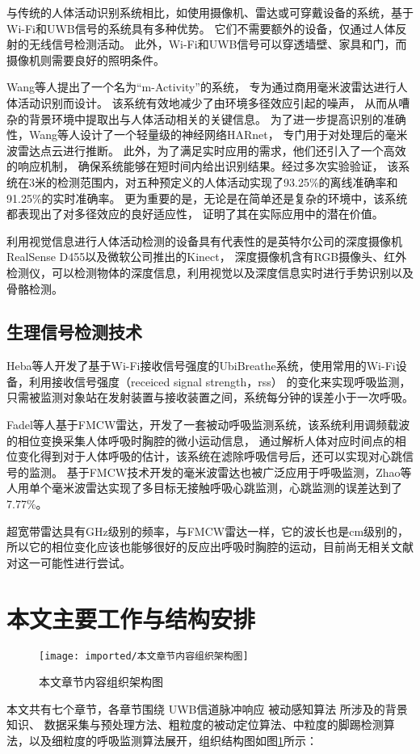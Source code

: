 与传统的人体活动识别系统相比，如使用摄像机、雷达或可穿戴设备的系统，基于Wi-Fi和UWB信号的系统具有多种优势。
它们不需要额外的设备，仅通过人体反射的无线信号检测活动。
此外，Wi-Fi和UWB信号可以穿透墙壁、家具和门，而摄像机则需要良好的照明条件。 

Wang等人\cite{Wang_Wifi_HAR}提出了一个名为“m-Activity”的系统，
专为通过商用毫米波雷达进行人体活动识别而设计。
该系统有效地减少了由环境多径效应引起的噪声，
从而从嘈杂的背景环境中提取出与人体活动相关的关键信息。
为了进一步提高识别的准确性，Wang等人设计了一个轻量级的神经网络HARnet，
专门用于对处理后的毫米波雷达点云进行推断。
此外，为了满足实时应用的需求，他们还引入了一个高效的响应机制，
确保系统能够在短时间内给出识别结果。经过多次实验验证，
该系统在3米的检测范围内，对五种预定义的人体活动实现了93.25\%的离线准确率和91.25\%的实时准确率。
更为重要的是，无论是在简单还是复杂的环境中，该系统都表现出了对多径效应的良好适应性，
证明了其在实际应用中的潜在价值。

利用视觉信息进行人体活动检测的设备具有代表性的是英特尔公司的深度摄像机RealSense D455以及微软公司推出的Kinect，
深度摄像机含有RGB摄像头、红外检测仪，可以检测物体的深度信息，利用视觉以及深度信息实时进行手势识别以及骨骼检测。

\subsection{生理信号检测技术}
Heba等人\cite{UbiBreathe}开发了基于Wi-Fi接收信号强度的UbiBreathe系统，使用常用的Wi-Fi设备，利用接收信号强度（receiced signal strength，rss）
的变化来实现呼吸监测，只需被监测对象站在发射装置与接收装置之间，系统每分钟的误差小于一次呼吸。

Fadel等人\cite{Adib_Breathe}基于FMCW雷达，开发了一套被动呼吸监测系统，该系统利用调频载波的相位变换采集人体呼吸时胸腔的微小运动信息，
通过解析人体对应时间点的相位变化得到对于人体呼吸的估计，该系统在滤除呼吸信号后，还可以实现对心跳信号的监测。
基于FMCW技术开发的毫米波雷达也被广泛应用于呼吸监测，Zhao等人\cite{zhao_Breathe}用单个毫米波雷达实现了多目标无接触呼吸心跳监测，心跳监测的误差达到了7.77\%。

超宽带雷达具有GHz级别的频率，与FMCW雷达一样，它的波长也是cm级别的，所以它的相位变化应该也能够很好的反应出呼吸时胸腔的运动，目前尚无相关文献对这一可能性进行尝试。

\section{本文主要工作与结构安排}
\begin{figure}[htbp]
    \centering
    \texttt{[image: imported/本文章节内容组织架构图]}
    \caption{\label{fig:structure}本文章节内容组织架构图}
\end{figure}
本文共有七个章节，各章节围绕 UWB信道脉冲响应 被动感知算法 所涉及的背景知识、
数据采集与预处理方法、粗粒度的被动定位算法、中粒度的脚踢检测算法，以及细粒度的呼吸监测算法展开，组织结构图如图\ref{fig:structure}所示：

